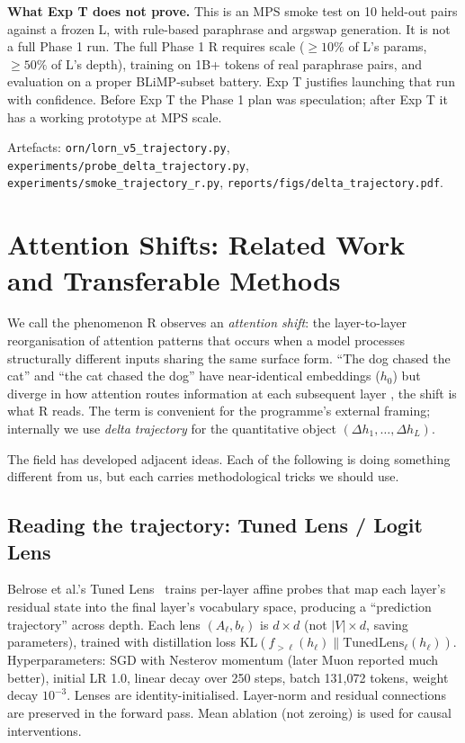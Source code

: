\documentclass[10pt, twocolumn, a4paper]{article}
\begin{document}
\textbf{What Exp T does not prove.} This is an MPS smoke test on 10 held-out pairs against a frozen L, with rule-based paraphrase and argswap generation. It is not a full Phase 1 run. The full Phase 1 R requires scale ($\geq 10\%$ of L's params, $\geq 50\%$ of L's depth), training on 1B+ tokens of real paraphrase pairs, and evaluation on a proper BLiMP-subset battery. Exp T justifies launching that run with confidence. Before Exp T the Phase 1 plan was speculation; after Exp T it has a working prototype at MPS scale.

Artefacts: \texttt{orn/lorn\_v5\_trajectory.py}, \texttt{experiments/probe\_delta\_trajectory.py}, \texttt{experiments/smoke\_trajectory\_r.py}, \texttt{reports/figs/delta\_trajectory.pdf}.


\section{Attention Shifts: Related Work and Transferable Methods}
\label{sec:attn-shifts}

We call the phenomenon R observes an \emph{attention shift}: the layer-to-layer reorganisation of attention patterns that occurs when a model processes structurally different inputs sharing the same surface form. ``The dog chased the cat'' and ``the cat chased the dog'' have near-identical embeddings ($h_0$) but diverge in how attention routes information at each subsequent layer ,  the shift is what R reads. The term is convenient for the programme's external framing; internally we use \emph{delta trajectory} for the quantitative object $(\Delta h_1, \ldots, \Delta h_L)$.

The field has developed adjacent ideas. Each of the following is doing something different from us, but each carries methodological tricks we should use.

\subsection*{Reading the trajectory: Tuned Lens / Logit Lens}

Belrose et al.'s Tuned Lens~\cite{belrose2023tuned} trains per-layer affine probes that map each layer's residual state into the final layer's vocabulary space, producing a ``prediction trajectory'' across depth. Each lens $(A_\ell, b_\ell)$ is $d \times d$ (not $|V| \times d$, saving parameters), trained with distillation loss $\mathrm{KL}(f_{>\ell}(h_\ell) \| \mathrm{TunedLens}_\ell(h_\ell))$. Hyperparameters: SGD with Nesterov momentum (later Muon reported much better), initial LR 1.0, linear decay over 250 steps, batch 131{,}072 tokens, weight decay $10^{-3}$. Lenses are identity-initialised. Layer-norm and residual connections are preserved in the forward pass. Mean ablation (not zeroing) is used for causal interventions.
\end{document}
